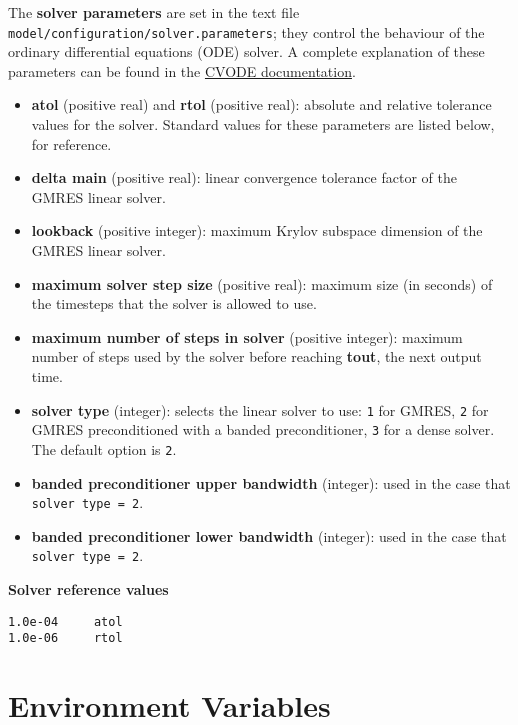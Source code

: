 The \textbf{solver parameters} are set in the text file
\texttt{model/configuration/solver.parameters}; they control the
behaviour of the ordinary differential equations (ODE) solver. A
complete explanation of these parameters can be found in the
\href{https://computation.llnl.gov/projects/sundials/sundials-software}{CVODE
  documentation}.

\begin{itemize}
\item \textbf{atol} (positive real) and \textbf{rtol} (positive real):
  absolute and relative tolerance values for the solver. Standard
  values for these parameters are listed below, for reference.
\item \textbf{delta main} (positive real): linear convergence
  tolerance factor of the GMRES linear solver.
\item \textbf{lookback} (positive integer): maximum Krylov subspace
  dimension of the GMRES linear solver.
\item \textbf{maximum solver step size} (positive real): maximum size
  (in seconds) of the timesteps that the solver is allowed to use.
\item \textbf{maximum number of steps in solver} (positive integer):
  maximum number of steps used by the solver before reaching
  \textbf{tout}, the next output time.
\item \textbf{solver type} (integer): selects the linear solver to
  use: \texttt{1} for GMRES, \texttt{2} for GMRES preconditioned with
  a banded preconditioner, \texttt{3} for a dense solver. The default
  option is \texttt{2}.
\item \textbf{banded preconditioner upper bandwidth} (integer): used
  in the case that \texttt{solver\ type\ =\ 2}.
\item \textbf{banded preconditioner lower bandwidth} (integer): used
  in the case that \texttt{solver\ type\ =\ 2}.
\end{itemize}

\textbf{Solver reference values}

\begin{verbatim}
1.0e-04     atol
1.0e-06     rtol
\end{verbatim}

\section{Environment Variables} \label{sec:environment-variables}

